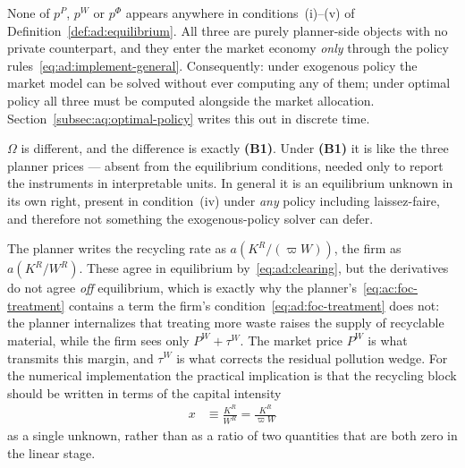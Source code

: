 \begin{remark}\label{rem:ad:pP}
None of $p^P$, $p^W$ or $p^\Phi$ appears anywhere in conditions~(i)--(v) of Definition~\ref{def:ad:equilibrium}. All three are purely planner-side objects with no private counterpart, and they enter the market economy \emph{only} through the policy rules~\eqref{eq:ad:implement-general}. Consequently: under exogenous policy the market model can be solved without ever computing any of them; under optimal policy all three must be computed alongside the market allocation. Section~\ref{subsec:aq:optimal-policy} writes this out in discrete time.

$\Omega$ is different, and the difference is exactly \textbf{(B1)}. Under \textbf{(B1)} it is like the three planner prices --- absent from the equilibrium conditions, needed only to report the instruments in interpretable units. In general it is an equilibrium unknown in its own right, present in condition~(iv) under \emph{any} policy including laissez-faire, and therefore not something the exogenous-policy solver can defer.
\end{remark}

\begin{remark}\label{rem:ad:argument}
The planner writes the recycling rate as $a\!\left(K^R/(\varpi W)\right)$, the firm as $a\!\left(K^R/W^R\right)$. These agree in equilibrium by~\eqref{eq:ad:clearing}, but the derivatives do not agree \emph{off} equilibrium, which is exactly why the planner's~\eqref{eq:ac:foc-treatment} contains a term the firm's condition~\eqref{eq:ad:foc-treatment} does not: the planner internalizes that treating more waste raises the supply of recyclable material, while the firm sees only $P^W+\tau^W$. The market price $P^W$ is what transmits this margin, and $\tau^W$ is what corrects the residual pollution wedge. For the numerical implementation the practical implication is that the recycling block should be written in terms of the capital intensity
\begin{align}
x &\equiv \frac{K^R}{W^R} = \frac{K^R}{\varpi W}
\label{eq:ad:x}
\end{align}
as a single unknown, rather than as a ratio of two quantities that are both zero in the linear stage.
\end{remark}

